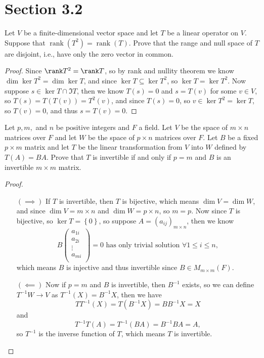 \section*{Section 3.2}

\begin{problem}
Let $V$ be a finite-dimensional vector space and let $T$ be a linear operator on $V$. Suppose that $\operatorname{rank}(T^{2})=\operatorname{rank}(T)$. Prove that the range and null space of $T$ are disjoint, i.e., have only the zero vector in common.
\end{problem}
\begin{proof}
    Since \(\rank T^2 = \rank T\), so by rank and nullity theorem we know \(\dim \ker T^2 = \dim \ker T\), and since \(\ker T \subseteq \ker T^2\), so \(\ker T = \ker T^2\). Now suppose \(s \in \ker T \cap \Im T\), then we know \(T(s) = 0\) and \(s = T(v)\) for some \(v \in V\), so \(T(s) = T\left( T(v) \right) = T^2(v) \), and since \(T(s) = 0\), so \(v \in \ker T^2 = \ker T\), so \(T(v) = 0\), and thus \(s = T(v) = 0\).             
\end{proof}

\begin{problem}
Let $p,m,$ and $n$ be positive integers and $F$ a field. Let $V$ be the space of $m\times n$ matrices over $F$ and let $W$ be the space of $p\times n$ matrices over $F$. Let $B$ be a fixed $p\times m$ matrix and let $T$ be the linear transformation from $V$ into $W$ defined by $T(A)=BA$. Prove that $T$ is invertible if and only if $p=m$ and $B$ is an invertible $m\times m$ matrix.
\end{problem}
\begin{proof}
    \vphantom{text}
    \begin{itemize}
        \item [\((\implies )\)] If \(T\) is invertible, then \(T\) is bijective, which means \(\dim V = \dim W\), and since \(\dim V = m \times n\) and \(\dim W = p \times n\), so \(m = p\). Now since \(T\) is bijective, so \(\ker T = \left\{ 0 \right\} \), so suppose \(A = (a_{ij})_{m \times n}\), then we know 
        \[
            B \begin{pmatrix}
                 a_{1i} \\
                 a_{2i} \\
                 \vdots \\
                 a_{mi} \\
            \end{pmatrix} = 0 \text{ has only trivial solution }\forall 1 \le i \le n,
        \] which means \(B\) is injective and thus invertible since \(B \in M_{m \times m}(F)\).  
        \item [\((\impliedby )\)] Now if \(p = m\) and \(B\) is invertible, then \(B^{-1} \) exists, so we can define \(T^{-1} W \to V \) as \(T^{-1}(X) = B^{-1}X\), then we have
        \[
            T T^{-1}(X) = T \left( B^{-1} X \right) = B B^{-1} X = X
        \]
        and 
        \[
            T^{-1} T (A) = T^{-1} \left( BA \right) = B^{-1} B A = A,
        \]
        so \(T^{-1} \) is the inverse function of \(T\), which means \(T\) is invertible.         
    \end{itemize}
\end{proof}


